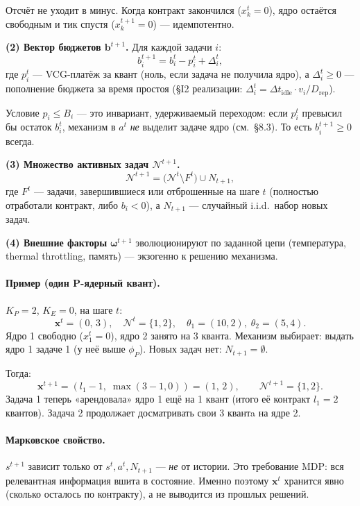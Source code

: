 \documentclass[11pt,a4paper]{article}
\begin{document}
\begin{why}
Отсчёт не уходит в минус. Когда контракт закончился ($x_k^t=0$),
ядро остаётся свободным и тик спустя ($x_k^{t+1}=0$) — идемпотентно.
\end{why}

\textbf{(2) Вектор бюджетов $\mathbf{b}^{t+1}$.} Для каждой задачи $i$:
\[
b_i^{t+1} = b_i^t - p_i^t + \Delta_i^t,
\]
где $p_i^t$ — VCG-платёж за квант (ноль, если задача не получила
ядро), а $\Delta_i^t \geq 0$ — пополнение бюджета за время простоя
(§I2 реализации: $\Delta_i^t = \Delta t_{\text{idle}}\cdot v_i /
D_{\text{rep}}$).

\begin{why}[Связь с §1.3]
Условие $p_i\leq B_i$ — это инвариант, удерживаемый переходом:
если $p_i^t$ превысил бы остаток $b_i^t$, механизм в $a^t$ \emph{не}
выделит задаче ядро (см.\ §8.3). То есть $b_i^{t+1}\geq 0$ всегда.
\end{why}

\textbf{(3) Множество активных задач $\mathcal{N}^{t+1}$.}
\[
\mathcal{N}^{t+1} = \bigl(\mathcal{N}^t \setminus F^t\bigr) \cup N_{t+1},
\]
где $F^t$ — задачи, завершившиеся или отброшенные на шаге $t$
(полностью отработали контракт, либо $b_i<0$), а $N_{t+1}$ —
случайный i.i.d.\ набор новых задач.

\textbf{(4) Внешние факторы} $\boldsymbol\omega^{t+1}$ эволюционируют
по заданной цепи (температура, thermal throttling, память) —
экзогенно к решению механизма.

\paragraph{Пример (один P-ядерный квант).}
$K_P=2$, $K_E=0$, на шаге $t$:
\[
\mathbf{x}^t=(0,\,3),\quad \mathcal{N}^t=\{1,2\},\quad
\theta_1=(10,2),\;\theta_2=(5,4).
\]
Ядро 1 свободно ($x_1^t=0$), ядро 2 занято на 3 кванта. Механизм
выбирает: выдать ядро 1 задаче 1 (у неё выше $\phi_P$). Новых задач
нет: $N_{t+1}=\emptyset$.

Тогда:
\[
\mathbf{x}^{t+1} = (l_1-1,\; \max(3-1,0)) = (1,\,2),\qquad
\mathcal{N}^{t+1}=\{1,2\}.
\]
Задача 1 теперь «арендовала» ядро 1 ещё на 1 квант (итого её
контракт $l_1=2$ квантов). Задача 2 продолжает досматривать свои
3 квантa на ядре 2.

\paragraph{Марковское свойство.}
$s^{t+1}$ зависит только от $s^t,a^t,N_{t+1}$ — \emph{не} от истории.
Это требование MDP: вся релевантная информация вшита в состояние.
Именно поэтому $\mathbf{x}^t$ хранится явно (сколько осталось по
контракту), а не выводится из прошлых решений.
\end{document}
